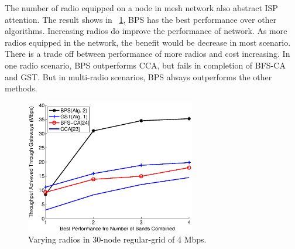 

The number of radio equipped on a node in mesh network also abstract ISP attention. 
The result shows in ~\ref{fig:varyradios}, BPS has the best performance over other algorithms. 
Increasing radios do improve the performance of network. 
As more radios equipped in the network, the benefit would be decrease in most scenario. 
There is a trade off between performance of more radios and cost increasing.
In one radio scenario, BPS outperforms CCA, but fails in completion of BFS-CA and GST.
But in multi-radio scenarios, BPS always outperforms the other methods.


\begin{figure}
\centering
\includegraphics[width=74mm]{figures/varyradios}
\vspace{-0.1in}
\caption{Varying radios in 30-node regular-grid of 4 Mbps.}                                                                               
\label{fig:varyradios}
\end{figure}





